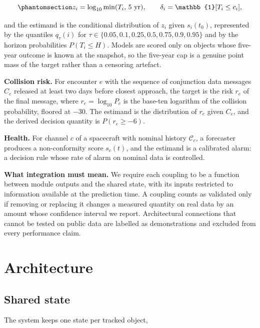 \documentclass[3p,times,twocolumn]{elsarticle}
\begin{document}
\begin{equation}\protect\phantomsection\label{eq:target}{z_i = \log_{10} \min(T_i,\, 5\ \text{yr}), \qquad \delta_i = \mathbb{1}[T_i \leq c_i],}\end{equation}

and the estimand is the conditional distribution of \(z_i\) given
\(s_i(t_0)\), represented by the quantiles \(q_\tau(i)\) for
\(\tau \in \{0.05, 0.1, 0.25, 0.5, 0.75, 0.9, 0.95\}\) and by the
horizon probabilities \(P(T_i \leq H)\). Models are scored only on
objects whose five-year outcome is known at the snapshot, so the
five-year cap is a genuine point mass of the target rather than a
censoring artefact.

\textbf{Collision risk.} For encounter \(e\) with the sequence of
conjunction data messages \(C_e\) released at least two days before
closest approach, the target is the risk \(r_e\) of the final message,
where \(r_e = \log_{10} P_c\) is the base-ten logarithm of the collision
probability, floored at \(-30\). The estimand is the distribution of
\(r_e\) given \(C_e\), and the derived decision quantity is
\(P(r_e \geq -6)\).

\textbf{Health.} For channel \(c\) of a spacecraft with nominal history
\(\mathcal{C}_c\), a forecaster produces a non-conformity score
\(s_c(t)\), and the estimand is a calibrated alarm: a decision rule
whose rate of alarm on nominal data is controlled.

\textbf{What integration must mean.} We require each coupling to be a
function between module outputs and the shared state, with its inputs
restricted to information available at the prediction time. A coupling
counts as validated only if removing or replacing it changes a measured
quantity on real data by an amount whose confidence interval we report.
Architectural connections that cannot be tested on public data are
labelled as demonstrations and excluded from every performance claim.

\section{Architecture}\label{sec:arch}

\subsection{Shared state}\label{shared-state}

The system keeps one state per tracked object,
\end{document}
